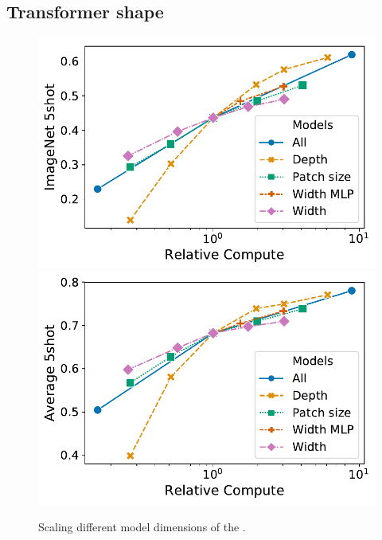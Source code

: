 \subsection{Transformer shape}
\begin{figure}

\begin{minipage}[t]{0.47\textwidth}
\begin{center}
\includegraphics[width=\textwidth]{images/compute_analysis/transformer_shape_imagenet_5shot.pdf}
\end{center}
\end{minipage}\quad
\begin{minipage}[t]{0.47\textwidth}
\begin{center}
\includegraphics[width=\textwidth]{images/compute_analysis/transformer_shape_average_5shot.pdf}
\end{center}
\label{fig:scaling_transformers_average}
\end{minipage}
\caption{Scaling different model dimensions of the \oursfull.}
\label{fig:scaling_transformers}
\end{figure}


